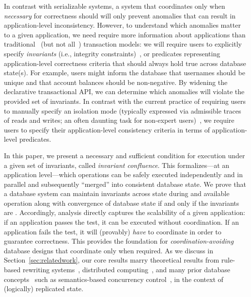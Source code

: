 
In contrast with serializable systems, a system that coordinates only
when \textit{necessary} for correctness should will only prevent
anomalies that can result in application-level inconsistency. However,
to understand which anomalies matter to a given application, we need
require more information about applications than
traditional~\cite{bernstein-book,gray-virtues} (but not
all~\cite{eswaran-consistency,korth-serializability,decomp-semantics,garciamolina-semantics,activedb-book,ic-survey,ic-survey-two})
transaction models: we will require users to explicitly specify
\textit{invariants} (i.e., integrity constraints)~\cite{traiger-tods},
or predicates representing application-level correctness criteria that
should always hold true across database state(s). For example, users
might inform the database that usernames should be unique and that
account balances should be non-negative. By widening the declarative
transactional API, we can determine which anomalies will violate the
provided set of invariants. In contrast with the current practice of
requiring users to manually specify an isolation mode (typically
expressed via admissible traces of reads and writes; an often daunting
task for non-expert users)~\cite{consistency-borders}, we require
users to specify their application-level consistency criteria in terms
of application-level predicates.

In this paper, we present a necessary and sufficient condition for
\cfree execution under a given set of invariants, called
\textit{invariant confluence}. This \iconfluence formalizes---at an
application level---which operations can be safely executed
independently and in parallel and subsequently ``merged'' into
consistent database state. We prove that a database system can
maintain invariants across state during \cfree and available operation
along with convergence of database state if and only if the invariants
are \iconfluent. Accordingly, \iconfluence analysis directly captures
the scalability of a given application: if an application passes the
\iconfluence test, it can be executed without coordination. If an
application fails the test, it will (provably) \textit{have} to
coordinate in order to guarantee correctness. This provides the
foundation for \textit{coordination-avoiding} database designs that
coordinate only when required. As we discuss in
Section~\ref{sec:relatedwork}, our core results marry theoretical
results from rule-based rewriting
systems~\cite{obs-confluence,termrewriting}, distributed
computing~\cite{herlihy-apologizing,gilbert-cap,hat-vldb}, and many
prior database concepts~\cite{activedb-book,ic-survey,ic-survey-two}
such as semantics-based concurrency
control~\cite{sdd1,decomp-semantics,badrinath-semantics,garciamolina-semantics,korth-serializability,atomictransactions,weihl-thesis},
in the context of (logically) replicated state.

